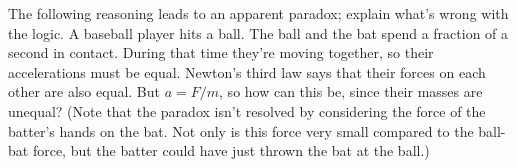  The following reasoning leads to an apparent paradox;
explain what's wrong with the logic. A baseball player hits
a ball. The ball and the bat spend a fraction of a second in
contact. During that time they're moving together, so their
accelerations must be equal. Newton's third law says that
their forces on each other are also equal. But $a=F/m$, so
how can this be, since their masses are unequal? (Note that
the paradox isn't resolved by considering the force of the
batter's hands on the bat. Not only is this force very small
compared to the ball-bat force, but the batter could have
just thrown the bat at the ball.)
